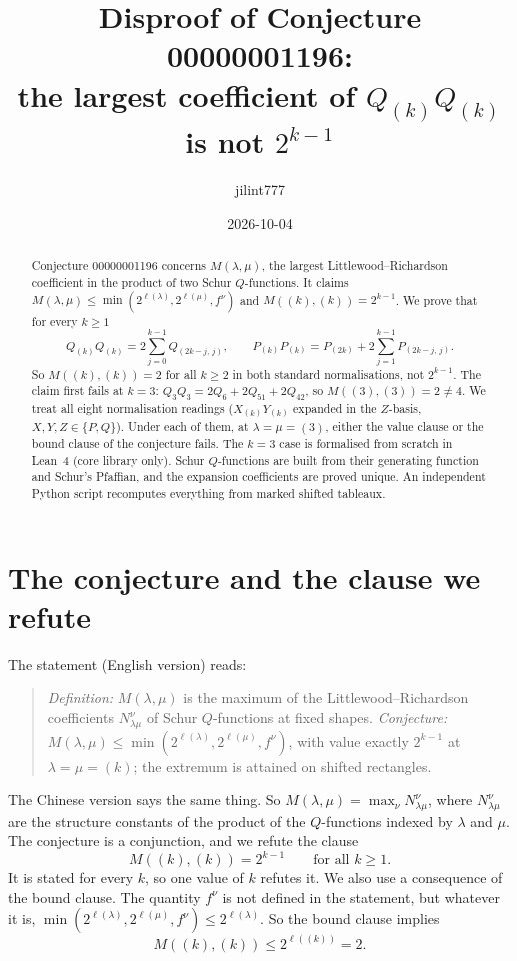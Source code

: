 \documentclass[11pt]{article}
\title{Disproof of Conjecture 00000001196:\\
the largest coefficient of $Q_{(k)}Q_{(k)}$ is not $2^{k-1}$}
\author{jilint777}
\date{2026-10-04}
\theoremstyle{definition}
\theoremstyle{remark}
\begin{document}
\maketitle

\begin{abstract}
Conjecture 00000001196 concerns $M(\lambda,\mu)$, the largest Littlewood--Richardson
coefficient in the product of two Schur $Q$-functions. It claims
$M(\lambda,\mu)\le\min(2^{\ell(\lambda)},2^{\ell(\mu)},f^\nu)$ and
$M((k),(k))=2^{k-1}$. We prove that for every $k\ge1$
\[
Q_{(k)}Q_{(k)} = 2\sum_{j=0}^{k-1} Q_{(2k-j,\,j)},\qquad
P_{(k)}P_{(k)} = P_{(2k)} + 2\sum_{j=1}^{k-1} P_{(2k-j,\,j)} .
\]
So $M((k),(k))=2$ for all $k\ge2$ in both standard normalisations, not $2^{k-1}$. The
claim first fails at $k=3$: $Q_3Q_3=2Q_6+2Q_{51}+2Q_{42}$, so $M((3),(3))=2\ne4$.
We treat all eight normalisation readings ($X_{(k)}Y_{(k)}$ expanded in the $Z$-basis,
$X,Y,Z\in\{P,Q\}$). Under each of them, at $\lambda=\mu=(3)$, either the value clause
or the bound clause of the conjecture fails. The $k=3$ case is formalised from scratch
in Lean~4 (core library only). Schur $Q$-functions are built from their generating
function and Schur's Pfaffian, and the expansion coefficients are proved unique. An
independent Python script recomputes everything from marked shifted tableaux.
\end{abstract}

\section{The conjecture and the clause we refute}

The statement (English version) reads:
\begin{quote}
\emph{Definition:} $M(\lambda,\mu)$ is the maximum of the Littlewood--Richardson
coefficients $N_{\lambda\mu}^{\nu}$ of Schur $Q$-functions at fixed shapes.
\emph{Conjecture:} $M(\lambda,\mu)\le \min(2^{\ell(\lambda)},2^{\ell(\mu)},f^{\nu})$,
with value exactly $2^{k-1}$ at $\lambda=\mu=(k)$; the extremum is attained on shifted
rectangles.
\end{quote}
The Chinese version says the same thing. So $M(\lambda,\mu)=\max_\nu N^\nu_{\lambda\mu}$,
where $N^\nu_{\lambda\mu}$ are the structure constants of the product of the
$Q$-functions indexed by $\lambda$ and $\mu$. The conjecture is a conjunction, and we
refute the clause
\begin{equation}\label{eq:value}
M((k),(k)) = 2^{k-1}\qquad\text{for all }k\ge1. \tag{V}
\end{equation}
It is stated for every $k$, so one value of $k$ refutes it. We also use a consequence of
the bound clause. The quantity $f^\nu$ is not defined in the statement, but whatever it is,
$\min(2^{\ell(\lambda)},2^{\ell(\mu)},f^\nu)\le 2^{\ell(\lambda)}$. So the bound clause
implies
\begin{equation}\label{eq:bound}
M((k),(k)) \le 2^{\ell((k))} = 2. \tag{B}
\end{equation}
\end{document}
